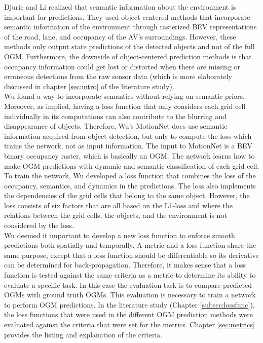 Djuric \cite{djuric2018motionpred} and Li \cite{li2020end} realized that semantic information about the environment is important for predictions. They used object-centered methods that incorporate semantic information of the environment through rasterized \gls{BEV} representations of the road, lane, and occupancy of the \gls{AV}'s surroundings. However, these methods only output state predictions of the detected objects and not of the full \gls{OGM}. Furthermore, the downside of object-centered prediction methods is that occupancy information could get lost or distorted when there are missing or erroneous detections from the raw sensor data (which is more elaborately discussed in chapter \ref{sec:intro} of the literature study). \\

Wu \cite{wu2020motionnet} found a way to incorporate semantics without relying on semantic priors. Moreover, as \cite{lange2020attention} implied, having a loss function that only considers each grid cell individually in its computations can also contribute to the blurring and disappearance of objects. Therefore, Wu's \cite{wu2020motionnet} MotionNet does use semantic information acquired from object detection, but only to compute the loss which trains the network, not as input information. The input to MotionNet is a \gls{BEV} binary occupancy raster, which is basically an \gls{OGM}. The network learns how to make \gls{OGM} predictions with dynamic and semantic classification of each grid cell. To train the network, Wu developed a loss function that combines the loss of the occupancy, semantics, and dynamics in the predictions. The loss also implements the dependencies of the grid cells that belong to the same object. However, the loss consists of six factors that are all based on the L1-loss and where the relations between the grid cells, the objects, and the environment is not considered by the loss. \\

Wu \cite{wu2020motionnet} deemed it important to develop a new loss function to enforce smooth predictions both spatially and temporally. A metric and a loss function share the same purpose, except that a loss function should be differentiable so its derivative can be determined for back-propagation. Therefore, it makes sense that a loss function is tested against the same criteria as a metric to determine its ability to evaluate a specific task. In this case the evaluation task is to compare predicted \glspl{OGM} with ground truth \glspl{OGM}. This evaluation is necessary to train a network to perform \gls{OGM} predictions. In the literature study (Chapter \ref{subsec:lossfunc}), the loss functions that were used in the different \gls{OGM} prediction methods were evaluated against the criteria that were set for the metrics. Chapter \ref{sec:metrics} provides the listing and explanation of the criteria. \\

